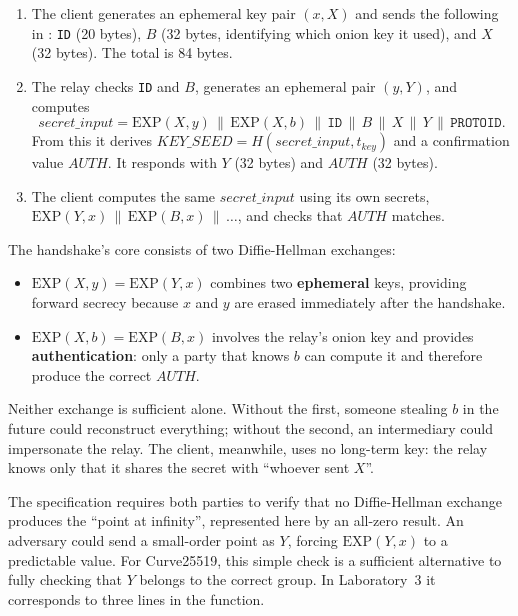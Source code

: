 \begin{enumerate}
  \item The client generates an ephemeral key pair $(x, X)$ and sends the following in : \texttt{ID} (20 bytes), $B$ (32 bytes, identifying which onion key it used), and $X$ (32 bytes). The total is 84 bytes.
  \item The relay checks \texttt{ID} and $B$, generates an ephemeral pair $(y, Y)$, and computes
  \[ \mathit{secret\_input} = \mathrm{EXP}(X, y) \,\|\, \mathrm{EXP}(X, b) \,\|\, \texttt{ID} \,\|\, B \,\|\, X \,\|\, Y \,\|\, \texttt{PROTOID}. \]
  From this it derives $\mathit{KEY\_SEED} = H(\mathit{secret\_input}, t_{\mathit{key}})$ and a confirmation value $\mathit{AUTH}$. It responds with $Y$ (32 bytes) and $\mathit{AUTH}$ (32 bytes).
  \item The client computes the same $\mathit{secret\_input}$ using its own secrets, $\mathrm{EXP}(Y, x) \,\|\,\allowbreak \mathrm{EXP}(B, x) \,\|\, \ldots$, and checks that $\mathit{AUTH}$ matches.
\end{enumerate}

The handshake's core consists of two Diffie-Hellman exchanges:
\begin{itemize}
  \item $\mathrm{EXP}(X, y) = \mathrm{EXP}(Y, x)$ combines two \textbf{ephemeral} keys, providing forward secrecy because $x$ and $y$ are erased immediately after the handshake.
  \item $\mathrm{EXP}(X, b) = \mathrm{EXP}(B, x)$ involves the relay's onion key and provides \textbf{authentication}: only a party that knows $b$ can compute it and therefore produce the correct $\mathit{AUTH}$.
\end{itemize}
Neither exchange is sufficient alone. Without the first, someone stealing $b$ in the future could reconstruct everything; without the second, an intermediary could impersonate the relay. The client, meanwhile, uses no long-term key: the relay knows only that it shares the secret with \enquote{whoever sent $X$}.

\begin{approfondimento}
The specification requires both parties to verify that no Diffie-Hellman exchange produces the \enquote{point at infinity}, represented here by an all-zero result. An adversary could send a small-order point as $Y$, forcing $\mathrm{EXP}(Y, x)$ to a predictable value. For Curve25519, this simple check is a sufficient alternative to fully checking that $Y$ belongs to the correct group. In Laboratory~3 it corresponds to three lines in the  function.
\end{approfondimento}

